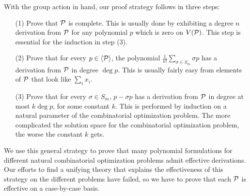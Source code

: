 With the group action in hand, our proof strategy follows in three steps:
\begin{enumerate}
\item[(1)] Prove that $\mathcal P$ is complete. This is usually done by exhibiting a degree $n$ derivation from $\mathcal P$ for any polynomial $p$ which is zero on $V(\mathcal P)$. This step is essential for the induction in step (3). 
\item[(2)] Prove that for every $p \in \langle \mathcal P \rangle$, the polynomial $\frac{1}{n!} \sum_{\sigma \in S_m} \sigma p$ has a derivation from $\mathcal P$ in degree $\deg p$. This is usually fairly easy from elements of $\mathcal P$ that look like $\sum_i x_i$. 
\item[(3)] Prove that for every $\sigma \in S_m$, $p - \sigma p$ has a derivation from $\mathcal P$ in degree at most $k \deg p$, for some constant $k$. This is performed by induction on a natural parameter of the combinatorial optimization problem. The more complicated the solution space for the combinatorial optimization problem, the worse the constant $k$ gets. 
\end{enumerate}
We use this general strategy to prove that many polynomial formulations for different natural combinatorial optimization problems admit effective derivations. 
Our efforts to find a unifying theory that explains the effectiveness of this strategy on the different problems have failed, so we have to prove that each $\mathcal P$ is effective on a case-by-case basis.  

